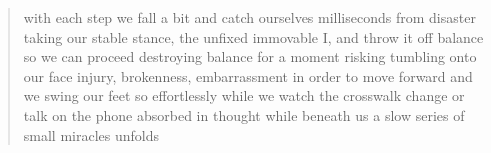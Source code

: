 
\begin{verse}
with each step we fall a bit
and catch ourselves
milliseconds from disaster
taking our stable stance,
the unfixed immovable I,
and throw it off balance
so we can proceed
destroying balance for a moment
risking tumbling onto our face
injury, brokenness, embarrassment
in order to move forward
and we swing our feet so effortlessly
while we watch the crosswalk change
or talk on the phone
absorbed in thought
while beneath us
a slow series of small miracles unfolds
\end{verse}
